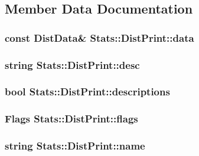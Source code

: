 \subsection{Member Data Documentation}
\hypertarget{structStats_1_1DistPrint_a5a1a2f61a36cddf75ea5b9de60c02aa1}{
\subsubsection[{data}]{\setlength{\rightskip}{0pt plus 5cm}const DistData\& {\bf Stats::DistPrint::data}}}
\label{structStats_1_1DistPrint_a5a1a2f61a36cddf75ea5b9de60c02aa1}
\hypertarget{structStats_1_1DistPrint_a20c3c6840bcaefcbd8a9ecbc468421da}{
\subsubsection[{desc}]{\setlength{\rightskip}{0pt plus 5cm}string {\bf Stats::DistPrint::desc}}}
\label{structStats_1_1DistPrint_a20c3c6840bcaefcbd8a9ecbc468421da}
\hypertarget{structStats_1_1DistPrint_a9b91df398053c0c61986dafcc2576c01}{
\subsubsection[{descriptions}]{\setlength{\rightskip}{0pt plus 5cm}bool {\bf Stats::DistPrint::descriptions}}}
\label{structStats_1_1DistPrint_a9b91df398053c0c61986dafcc2576c01}
\hypertarget{structStats_1_1DistPrint_a29f5554b5ad6a9b573fa8e0c4286a128}{
\subsubsection[{flags}]{\setlength{\rightskip}{0pt plus 5cm}Flags {\bf Stats::DistPrint::flags}}}
\label{structStats_1_1DistPrint_a29f5554b5ad6a9b573fa8e0c4286a128}
\hypertarget{structStats_1_1DistPrint_a8effa42b5694542dac7f6fb7f1df4230}{
\subsubsection[{name}]{\setlength{\rightskip}{0pt plus 5cm}string {\bf Stats::DistPrint::name}}}
